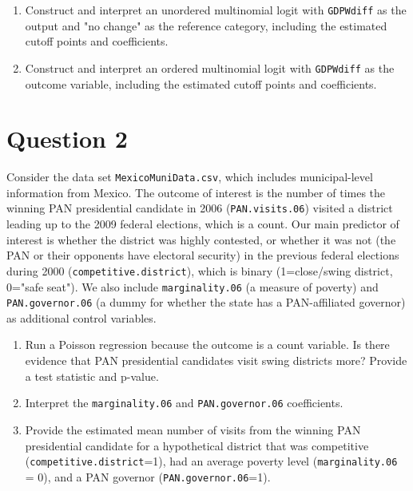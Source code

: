\documentclass[12pt,letterpaper]{article}
\begin{document}
\begin{enumerate}
	\item Construct and interpret an unordered multinomial logit with \texttt{GDPWdiff} as the output and "no change" as the reference category, including the estimated cutoff points and coefficients.
	\item Construct and interpret an ordered multinomial logit with \texttt{GDPWdiff} as the outcome variable, including the estimated cutoff points and coefficients.
	
	
\end{enumerate}

\section*{Question 2} 
\vspace{.25cm}

\noindent Consider the data set \texttt{MexicoMuniData.csv}, which includes municipal-level information from Mexico. The outcome of interest is the number of times the winning PAN presidential candidate in 2006 (\texttt{PAN.visits.06}) visited a district leading up to the 2009 federal elections, which is a count. Our main predictor of interest is whether the district was highly contested, or whether it was not (the PAN or their opponents have electoral security) in the previous federal elections during 2000 (\texttt{competitive.district}), which is binary (1=close/swing district, 0="safe seat"). We also include \texttt{marginality.06} (a measure of poverty) and \texttt{PAN.governor.06} (a dummy for whether the state has a PAN-affiliated governor) as additional control variables. 

\begin{enumerate}
	\item [(a)]
	Run a Poisson regression because the outcome is a count variable. Is there evidence that PAN presidential candidates visit swing districts more? Provide a test statistic and p-value.

	\item [(b)]
	Interpret the \texttt{marginality.06} and \texttt{PAN.governor.06} coefficients.
	
	\item [(c)]
	Provide the estimated mean number of visits from the winning PAN presidential candidate for a hypothetical district that was competitive (\texttt{competitive.district}=1), had an average poverty level (\texttt{marginality.06} = 0), and a PAN governor (\texttt{PAN.governor.06}=1).
\end{enumerate}
\end{document}

